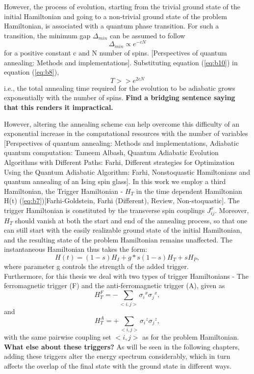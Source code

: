 \documentclass[12]{article}
\begin{document}
However, the process of evolution, starting from the trivial ground state of the initial Hamiltonian and going to a non-trivial ground state of the problem Hamiltonian, is associated with a quantum phase transition. For such a transition, the minimum gap $\Delta_{min}$ can be assumed to follow
\begin{equation}
\Delta_{min} \propto e^{-cN} \label{eq:b10}
\end{equation}
for a positive constant c and N number of spins. [Perspectives of quantum annealing: Methods and implementations]. Substituting equation (\ref{eq:b10}) in equation (\ref{eq:b8}),
\begin{equation}
 T>> e^{2cN} \label{eq:b11}
\end{equation}
i.e., the total annealing time required for the evolution to be adiabatic grows exponentially with the number of spins. \textbf{Find a bridging sentence saying that this renders it impractical.} 

However, altering the annealing scheme can help overcome this difficulty of an exponential increase in the computational resources with the number of variables [Perspectives of quantum annealing: Methods and implementations, Adiabatic quantum computation: Tameem Albash, Quantum Adiabatic Evolution Algorithms with Different Paths: Farhi, Different strategies for Optimization Using the Quantum Adiabatic Algorithm: Farhi, Nonstoquastic Hamiltonians and quantum annealing of an Ising spin glass]. In this work we employ a third Hamiltonian, the Trigger Hamiltonian - $H_T$ in the time dependent Hamiltonian H(t) (\ref{eq:b7})[Farhi-Goldstein, Farhi (Different), Review, Non-stoquastic]. The trigger Hamiltonian is constituted by the transverse spin couplings $J_{ij}^x$. Moreover, $H_T$ should vanish at both the start and end of the annealing process, so that one can still start with the easily realizable ground state of the initial Hamiltonian, and the resulting state of the problem Hamiltonian remains unaffected. The instantaneous Hamiltonian thus takes the form: 
\begin{equation}
H(t)= (1-s)H_I + g*s(1-s)H_T + sH_P ,\label{eq:n10}
\end{equation} 
where parameter g controls the strength of the added trigger.\\
Furthermore, for this thesis we deal with two types of trigger Hamiltonians - The ferromagnetic trigger (F) and the anti-ferromagnetic trigger (A), given as
\begin{equation}
H_T^F = - \sum\limits_{<i,j>}{\sigma_i}^x{\sigma_j}^x,    \label{eq:n23}
\end{equation}
and
\begin{equation}
H_T^A= +\sum\limits_{<i,j>}{\sigma_i}^z{\sigma_j}^z,          \label{eq:n24}
\end{equation}
with the same pairwise coupling set $<i,j>$ as for the problem Hamiltonian.
\textbf{What else about these triggers?}
As will be seen in the following chapters, adding these triggers alter the energy spectrum considerably, which in turn affects the overlap of the final state with the ground state in different ways. \\
\end{document}
